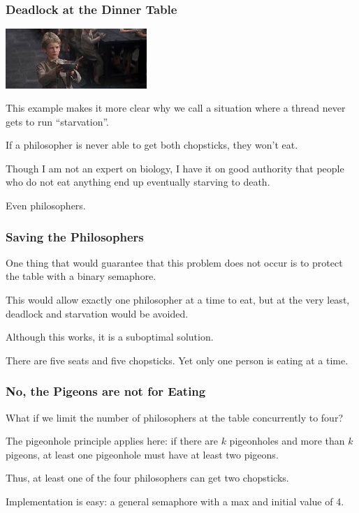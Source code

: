 \begin{frame}
	\frametitle{Deadlock at the Dinner Table}

	\begin{center}
		\includegraphics[width=0.4\textwidth]{images/olivertwist.jpeg}
	\end{center}

	This example makes it more clear why we call a situation where a thread never gets to run ``starvation''.

	If a philosopher is never able to get both chopsticks, they won't eat.

	Though I am not an expert on biology, I have it on good authority that people who do not eat anything end up eventually starving to death.

	Even philosophers.

\end{frame}

\begin{frame}
	\frametitle{Saving the Philosophers}

	One thing that would guarantee that this problem does not occur is to protect the table with a binary semaphore.

	This would allow exactly one philosopher at a time to eat, but at the very least, deadlock and starvation would be avoided.

	Although this works, it is a suboptimal solution.

	There are five seats and five chopsticks. Yet only one person is eating at a time.

\end{frame}


\begin{frame}
	\frametitle{No, the Pigeons are not for Eating}

	What if we limit the number of philosophers at the table concurrently to four?

	The pigeonhole principle applies here: if there are $k$ pigeonholes and more than $k$ pigeons, at least one pigeonhole must have at least two pigeons.

	Thus, at least one of the four philosophers can get two chopsticks.

	Implementation is easy: a general semaphore with a max and initial value of 4.

\end{frame}

